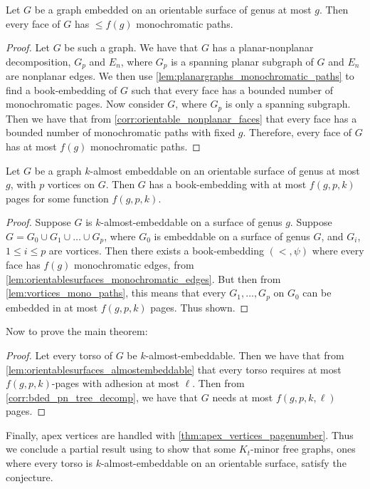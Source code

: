 \begin{lemma}\label{lem:orientablesurfaces_monochromatic_edges}
	Let $G$ be a graph embedded on an orientable surface of genus at most $g$. Then every face of $G$ has $ \leq f(g)$ monochromatic paths.
\end{lemma}
\begin{proof}
	Let $G$ be such a graph. We have that $G$ has a planar-nonplanar decomposition, $G_p$ and $E_n$, where $G_p$ is a spanning planar subgraph of $G$ and $E_n$ are nonplanar edges. We then use \cref{lem:planargraphs_monochromatic_paths} to find a book-embedding of $G$ such that every face has a bounded number of monochromatic pages.
	Now consider $G$, where $G_p$ is only a spanning subgraph. Then we have that from \cref{corr:orientable_nonplanar_faces} that every face has a bounded number of monochromatic paths with fixed $g$. Therefore, every face of $G$ has at most $f(g)$ monochromatic paths.
\end{proof}
\begin{lemma}\label{lem:orientablesurfaces_almostembeddable}
	Let $G$ be a graph $k$-almost embeddable on an orientable surface of genus at most $g$, with $p$ vortices on $G$. Then $G$ has a book-embedding with at most $f(g, p, k)$ pages for some function $f(g, p, k)$.
\end{lemma}

\begin{proof}
	Suppose $G$ is $k$-almost-embeddable on a surface of genus $g$. Suppose $G = G_0 \cup G_1 \cup \ldots \cup G_p$, where $G_0$ is embeddable on a surface of genus $G$, and $G_i$, $1 \leq i \leq p$ are vortices. Then there exists a book-embedding $(<, \psi)$ where every face has $f(g)$ monochromatic edges, from \cref{lem:orientablesurfaces_monochromatic_edges}. But then from \cref{lem:vortices_mono_paths}, this means that every $G_1, \ldots, G_p$ on $G_0$ can be embedded in at most $f(g, p, k)$ pages. Thus shown.
\end{proof}

Now to prove the main theorem:
\begin{proof}
	Let every torso of $G$ be $k$-almost-embeddable. Then we have that from \cref{lem:orientablesurfaces_almostembeddable} that every torso requires at most $f(g, p, k)$-pages with adhesion at most $\ell$. Then from \cref{corr:bded_pn_tree_decomp}, we have that $G$ needs at most $f(g, p, k, \ell)$ pages.
\end{proof}
Finally, apex vertices are handled with \cref{thm:apex_vertices_pagenumber}. Thus we conclude a partial result using \textcite{robertsonGraphMinorsXVI2003} to show that some $K_t$-minor free graphs, ones where every torso is $k$-almost-embeddable on an orientable surface, satisfy the conjecture.
